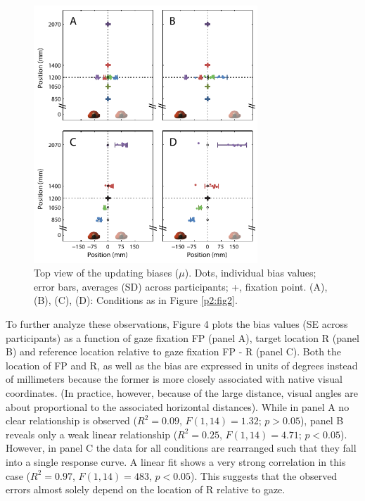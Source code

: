\begin{figure}
    \includegraphics[width=0.75\textwidth]{src/paper2/figure3.pdf}
    
    \caption{Top view of the updating biases ($\mu$). Dots, individual bias values; error bars, averages (\textpm SD) across participants; +, fixation point. (A), (B), (C), (D): Conditions as in Figure \ref{p2:fig2}.}
    
    \label{p2:fig3}
\end{figure}

To further analyze these observations, Figure 4 plots the bias values ({\textpm}SE across participants) as a function of gaze fixation FP (panel A), target location R (panel B) and reference location relative to gaze fixation FP - R (panel C). Both the location of FP and R, as well as the bias are expressed in units of degrees instead of millimeters because the former is more closely associated with native visual coordinates. (In practice, however, because of the large distance, visual angles are about proportional to the associated horizontal distances). While in panel A no clear relationship is observed ($R^2 = 0.09$, $F(1,14) = 1.32$; $p > 0.05$), panel B reveals only a weak linear relationship ($R^2 = 0.25$, $F(1,14) = 4.71$; $p < 0.05$). However, in panel C the data for all conditions are rearranged such that they fall into a single response curve. A linear fit shows a very strong correlation in this case ($R^2 = 0.97$, $F(1,14) = 483$, $p < 0.05$). This suggests that the observed errors almost solely depend on the location of R relative to gaze.

